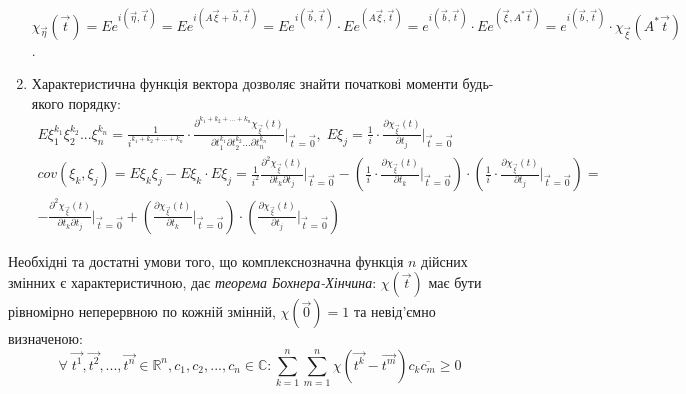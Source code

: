 \begin{enumerate}
    $\chi_{\vec{\eta}}(\vec{t}) = E e^{i(\vec{\eta}, \vec{t})} = E e^{i(A\vec{\xi} + \vec{b}, \vec{t})}=
    E e^{i(\vec{b}, \vec{t})} \cdot E e^{(A\vec{\xi}, \vec{t})} = e^{i(\vec{b}, \vec{t})} \cdot E e^{(\vec{\xi}, A^{*}\vec{t})} = e^{i(\vec{b}, \vec{t})} \cdot \chi_{\vec{\xi}}(A^{*}\vec{t})$.
    \item Характеристична функція вектора дозволяє знайти початкові моменти будь-якого порядку:
    \begin{gather*}
        E\xi_1^{k_1} \xi_2^{k_2} ... \xi_n^{k_n} = \frac{1}{i^{k_1 + k_2 + ... + k_n}} \cdot \frac{\partial^{k_1 + k_2 + ... + k_n}\chi_{\vec{\xi}}(t)}{\partial t_1^{k_1} \partial t_2^{k_2} ... \partial t_n^{k_n}} \Biggr \vert_{\vec{t} = \vec{0}}, 
        \; E\xi_j = \frac{1}{i} \cdot\frac{\partial \chi_{\vec{\xi}}(t)}{\partial t_j} \Biggr \vert_{\vec{t} = \vec{0}} \\
        {cov}(\xi_k, \xi_j) = E\xi_k\xi_j - E\xi_k\cdot E\xi_j = \frac{1}{i^2} \frac{\partial^2 \chi_{\vec{\xi}}(t)}{\partial t_k \partial t_j} \Biggr \vert_{\vec{t} = \vec{0}} - 
        \left( \frac{1}{i} \cdot\frac{\partial \chi_{\vec{\xi}}(t)}{\partial t_k} \Biggr \vert_{\vec{t} = \vec{0}}\right) \cdot \left( \frac{1}{i} \cdot\frac{\partial \chi_{\vec{\xi}}(t)}{\partial t_j} \Biggr \vert_{\vec{t} = \vec{0}}\right) = \\
        -\frac{\partial^2 \chi_{\vec{\xi}}(t)}{\partial t_k \partial t_j} \Biggr \vert_{\vec{t} = \vec{0}} + 
        \left(\frac{\partial \chi_{\vec{\xi}}(t)}{\partial t_k} \Biggr \vert_{\vec{t} = \vec{0}}\right) \cdot \left(\frac{\partial \chi_{\vec{\xi}}(t)}{\partial t_j} \Biggr \vert_{\vec{t} = \vec{0}}\right)\end{gather*}
\end{enumerate}

Необхідні та достатні умови того, що комплекснозначна функція $n$ дійсних змінних є характеристичною, дає
\emph{теорема Бохнера-Хінчина}: $\chi(\vec{t})$ має бути рівномірно неперервною по кожній змінній, $\chi(\vec{0}) = 1$ та 
невід'ємно визначеною: $$
    \forall \; \vec{t^1}, \vec{t^2}, ..., \vec{t^n} \in \mathbb{R}^n, c_1, c_2, ..., c_n \in \mathbb{C}: 
    \sum\limits_{k=1}^n {\sum\limits_{m=1}^n \chi(\vec{t^k} - \vec{t^m}) c_k \overline{c_m}} \geq 0$$